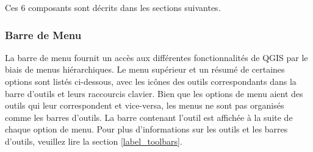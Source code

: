 Ces 6 composants sont d\'ecrits dans les sections suivantes.

%

\subsubsection{Barre de Menu}\label{label_menubar}

La barre de menu fournit un acc\`es aux diff\'erentes fonctionnalit\'es de QGIS par le biais de menus hi\'erarchiques. Le menu sup\'erieur et un r\'esum\'e de certaines options sont list\'es ci-dessous, avec les ic\^ones des outils correspondants dans la barre d'outils et leurs raccourcis clavier. Bien que les options de menu aient des outils qui leur correspondent et vice-versa, les menus ne sont pas organis\'es comme les barres d'outils. La barre contenant l'outil est affich\'ee \`a la suite de chaque option de menu. Pour plus d'informations sur les outils et les barres d'outils, veuillez lire la section \ref{label_toolbars}.

